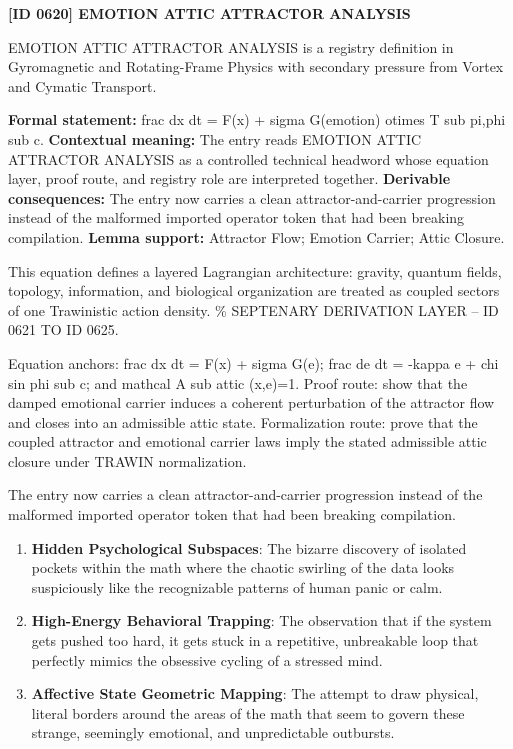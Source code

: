 \clearpage
\noindent\textbf{[ID 0620] EMOTION ATTIC ATTRACTOR ANALYSIS}\par
\vspace{0.35em}
\begingroup\small
{}
EMOTION ATTIC ATTRACTOR ANALYSIS is a registry definition in Gyromagnetic and Rotating-Frame Physics with secondary pressure from Vortex and Cymatic Transport.

\begingroup\footnotesize\setlength{\emergencystretch}{3em}\sloppy
\textbf{Formal statement:} frac dx dt = F(x) + sigma G(emotion) otimes T sub pi,phi sub c. \textbf{Contextual meaning:} The entry reads EMOTION ATTIC ATTRACTOR ANALYSIS as a controlled technical headword whose equation layer, proof route, and registry role are interpreted together. \textbf{Derivable consequences:} The entry now carries a clean attractor-and-carrier progression instead of the malformed imported operator token that had been breaking compilation. \textbf{Lemma support:} Attractor Flow; Emotion Carrier; Attic Closure.\par
\endgroup

This equation defines a layered Lagrangian architecture: gravity, quantum fields, topology, information, and biological organization are treated as coupled sectors of one Trawinistic action density. \% SEPTENARY DERIVATION LAYER -- ID 0621 TO ID 0625.

Equation anchors: frac dx dt = F(x) + sigma G(e); frac de dt = -kappa e + chi sin phi sub c; and mathcal A sub attic (x,e)=1. Proof route: show that the damped emotional carrier induces a coherent perturbation of the attractor flow and closes into an admissible attic state. Formalization route: prove that the coupled attractor and emotional carrier laws imply the stated admissible attic closure under TRAWIN normalization.

The entry now carries a clean attractor-and-carrier progression instead of the malformed imported operator token that had been breaking compilation.
\endgroup

\begin{enumerate}[leftmargin=1.6em,itemsep=6pt,topsep=4pt]
\item \textbf{Hidden Psychological Subspaces}: The bizarre discovery of isolated pockets within the math where the chaotic swirling of the data looks suspiciously like the recognizable patterns of human panic or calm.
\item \textbf{High-Energy Behavioral Trapping}: The observation that if the system gets pushed too hard, it gets stuck in a repetitive, unbreakable loop that perfectly mimics the obsessive cycling of a stressed mind.
\item \textbf{Affective State Geometric Mapping}: The attempt to draw physical, literal borders around the areas of the math that seem to govern these strange, seemingly emotional, and unpredictable outbursts.
\end{enumerate}

